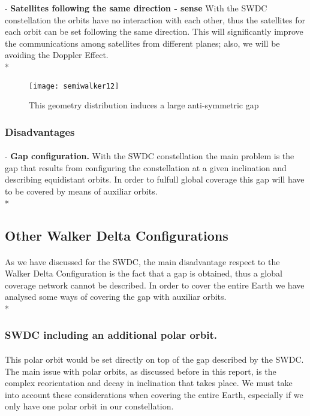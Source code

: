 \documentclass{article}
\begin{document}
-	\textbf{Satellites following the same direction - sense} With the SWDC constellation the orbits have no interaction with each other, thus the satellites for each orbit can be set following the same direction. This will significantly improve the communications among satellites from different planes; also, we will be avoiding the Doppler Effect.\\*

\begin{figure}[h]
\texttt{[image: semiwalker12]}
\centering
\caption{This geometry distribution induces a large anti-symmetric gap}
\end{figure}

\subsubsection{Disadvantages}
\paragraph{ }

-	\textbf{Gap configuration.} With the SWDC constellation the main problem is the gap that results from configuring the constellation at a given inclination and describing equidistant orbits. In order to fulfull global coverage this gap will have to be covered by means of auxiliar orbits. \\*


\subsection{Other Walker Delta Configurations}
\paragraph{ }
As we have discussed for the SWDC, the main disadvantage respect to the Walker Delta Configuration is the fact that a gap is obtained, thus a global coverage network cannot be described. In order to cover the entire Earth we have analysed some ways of covering the gap with auxiliar orbits. \\*



\subsubsection{SWDC including an additional polar orbit.}
\paragraph{ }
This polar orbit would be set directly on top of the gap described by the SWDC. The main issue with polar orbits, as discussed before in this report, is the complex reorientation and decay in inclination that takes place. We must take into account these considerations when covering the entire Earth, especially if we only have one polar orbit in our constellation. 
\end{document}

